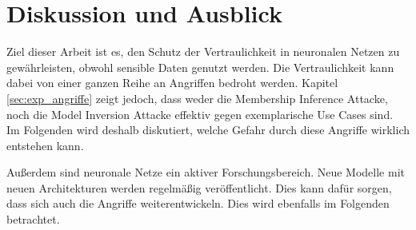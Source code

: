 \chapter{Diskussion und Ausblick}

Ziel dieser Arbeit ist es, den Schutz der Vertraulichkeit in neuronalen Netzen zu gewährleisten, obwohl sensible Daten genutzt werden. 
Die Vertraulichkeit kann dabei von einer ganzen Reihe an Angriffen bedroht werden.
Kapitel \ref{sec:exp_angriffe} zeigt jedoch, dass weder die Membership Inference Attacke, noch die Model Inversion Attacke effektiv gegen exemplarische Use Cases sind.
Im Folgenden wird deshalb diskutiert, welche Gefahr durch diese Angriffe wirklich entstehen kann.

Außerdem sind neuronale Netze ein aktiver Forschungsbereich. 
Neue Modelle mit neuen Architekturen werden regelmäßig veröffentlicht.
Dies kann dafür sorgen, dass sich auch die Angriffe weiterentwickeln. 
Dies wird ebenfalls im Folgenden betrachtet.







